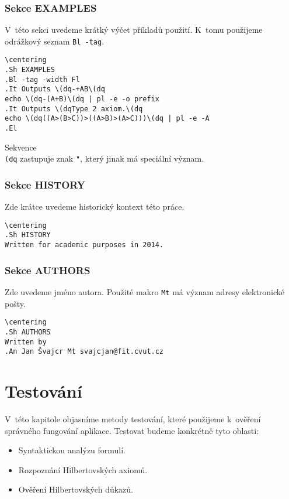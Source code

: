 \documentclass[thesis=B,czech,hidelinks]{FITthesis}[2012/06/26]
\begin{document}
\subsection{Sekce EXAMPLES}

V~této sekci uvedeme krátký výčet příkladů použití. K~tomu použijeme odrážkový seznam \texttt{Bl -tag}.

\begin{verbatim}
\centering
.Sh EXAMPLES
.Bl -tag -width Fl
.It Outputs \(dq-+AB\(dq
echo \(dq-(A+B)\(dq | pl -e -o prefix
.It Outputs \(dqType 2 axiom.\(dq
echo \(dq((A>(B>C))>((A>B)>(A>C)))\(dq | pl -e -A
.El
\end{verbatim}

Sekvence \texttt{\\(dq} zastupuje znak \texttt{"}, který jinak má speciální význam.

\subsection{Sekce HISTORY}

Zde krátce uvedeme historický kontext této práce.

\begin{verbatim}
\centering
.Sh HISTORY
Written for academic purposes in 2014.
\end{verbatim}

\subsection{Sekce AUTHORS}

Zde uvedeme jméno autora. Použité makro \texttt{Mt} má význam adresy elektronické pošty.

\begin{verbatim}
\centering
.Sh AUTHORS
Written by
.An Jan Švajcr Mt svajcjan@fit.cvut.cz
\end{verbatim}

%
%
%

\chapter{Testování}

V~této kapitole objasníme metody testování, které použijeme k~ověření správného fungování aplikace. Testovat budeme konkrétně tyto oblasti:

\begin{itemize}
	\item Syntaktickou analýzu formulí.
	\item Rozpoznání Hilbertovských axiomů.
	\item Ověření Hilbertovských důkazů.
\end{itemize}
\end{document}
